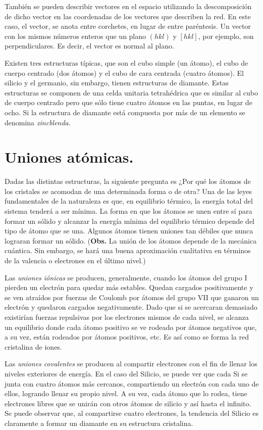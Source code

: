 \documentclass[12pt]{article}
\begin{document}
También se pueden describir vectores en el espacio utilizando la descomposición de dicho vector en las coordenadas de los vectores que describen la red. En este caso, el vector, se anota entre corchetes, en lugar de entre paréntesis. Un vector con los mismos números enteros que un plano $(hkl)$ y $[hkl]$, por ejemplo, son perpendiculares. Es decir, el vector es normal al plano.

Existen tres estructuras típicas, que son el cubo simple (un átomo), el cubo de cuerpo centrado (dos átomos) y el cubo de cara centrada (cuatro átomos). El silicio y el germanio, sin embargo, tienen estructuras de diamante. Estas estructuras se componen de una celda unitaria tetrahédrica que es similar al cubo de cuerpo centrado pero que sólo tiene cuatro átomos en las puntas, en lugar de ocho. Si la estructura de diamante está compuesta por más de un elemento se denomina \emph{zincblenda}.

\section{Uniones atómicas.}

Dadas las distintas estructuras, la siguiente pregunta es ¿Por qué los átomos de los cristales se acomodan de una determinada forma o de otra? Una de las leyes fundamentales de la naturaleza es que, en equilibrio térmico, la energía total del sistema tenderá a ser mínima. La forma en que los átomos se unen entre sí para formar un sólido y alcanzar la energía mínima del equilibrio térmico depende del tipo de átomo que se una. Algunos átomos tienen uniones tan débiles que nunca lograran formar un sólido. (\textbf{Obs.} La unión de los átomos depende de la mecánica cuántica. Sin embargo, se hará una buena aproximación cualitativa en términos de la valencia o electrones en el último nivel.)

Las \emph{uniones iónicas} se producen, generalmente, cuando los átomos del grupo I pierden un electrón para quedar más estables. Quedan cargados positivamente y se ven atraídos por fuerzas de Coulomb por átomos del grupo VII que ganaron un electrón y quedaron cargados negativamente. Dado que si se acercaran demasiado existirían fuerzas repulsivas por los electrones mismos de cada nivel, se alcanza un equilibrio donde cada átomo positivo se ve rodeado por átomos negativos que, a su vez, están rodeados por átomos positivos, etc. Es así como se forma la red cristalina de iones.

Las \emph{uniones covalentes} se producen al compartir electrones con el fin de llenar los niveles exteriores de energía. En el caso del Silicio, se puede ver que cada Si se junta con cuatro átomos más cercanos, compartiendo un electrón con cada uno de ellos, logrando llenar su propio nivel. A su vez, cada átomo que lo rodea, tiene electrones libres que se unirán con otros átomos de silicio y así hasta el infinito. Se puede observar que, al compartirse cuatro electrones, la tendencia del Silicio es claramente a formar un diamante en su estructura cristalina.
\end{document}
